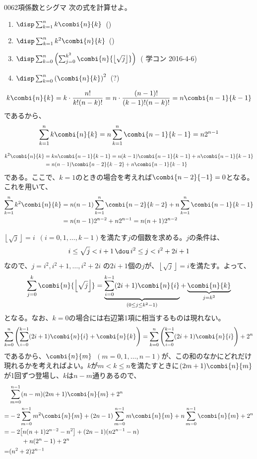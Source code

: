 \begin{prob}{006}{}{2項係数とシグマ}
 次の式を計算せよ。
 \begin{enumerate}
  \item $\disp \sum_{k=1}^n k \combi{n}{k}$~()
  \item $\disp \sum_{k=1}^n k^2 \combi{n}{k}$~()
  \item $\disp \sum_{k=0}^n \left(\sum_{j=0}^{k^2} \combi{n}{\left\lfloor \sqrt{j} \right\rfloor}\right)$~( 学コン 2016-4-6)
  \item $\disp \sum_{k=0}^n \left(\combi{n}{k}\right)^2$~(\hosi ?)
 \end{enumerate}
\end{prob}
\[ k\combi{n}{k}=k\cdot\frac{n!}{k! (n-k)!}=n\cdot\frac{(n-1)!}{(k-1)!(n-k)!}=n\combi{n-1}{k-1} \]
であるから、
\[ \sum_{k=1}^n k\combi{n}{k}=n\sum_{k=1}^n \combi{n-1}{k-1}=n2^{n-1} \]

\begin{align*}
 k^2\combi{n}{k}&=kn\combi{n-1}{k-1}=n(k-1)\combi{n-1}{k-1}+n\combi{n-1}{k-1} \\
 &=n(n-1)\combi{n-2}{k-2}+n\combi{n-1}{k-1}
\end{align*}
である。ここで、$k=1$のときの場合を考えれば$\combi{n-2}{-1}=0$となる。これを用いて、
\begin{align*}
 \sum_{k=1}^n k^2\combi{n}{k}&=n(n-1)\sum_{k=1}^n\combi{n-2}{k-2}+n\sum_{k=1}^n\combi{n-1}{k-1} \\
 &=n(n-1)2^{n-2}+n2^{n-1}=n(n+1)2^{n-2}
\end{align*}

$\left\lfloor\sqrt{j}\right\rfloor=i$~$(i=0,1,\dots,k-1)$を満たす$j$の個数を求める。$j$の条件は、
\[ i\le \sqrt{j}< i+1 \,\dou\, i^2\le j<i^2+2i+1 \]
なので、$j=i^2, i^2+1,\dots , i^2+2i$ の$2i+1$個の$j$が、$\left\lfloor\sqrt{j}\right\rfloor=i$を満たす。よって、
\[ \sum_{j=0}^k\combi{n}{\left\lfloor\sqrt{j}\right\rfloor} = \underbrace{\sum_{i=0}^{k-1}(2i+1)\combi{n}{i}}_{(0\le j\le k^2-1)} + \underbrace{\combi{n}{k}}_{j=k^2} \]
となる。なお、$k=0$の場合には右辺第1項に相当するものは現れない。
\[ \sum_{k=0}^n\left(\sum_{i=0}^{k-1}(2i+1)\combi{n}{i} +\combi{n}{k}\right) = \sum_{k=0}^{n}\left(\sum_{i=0}^{k-1}(2i+1)\combi{n}{i}\right) + 2^n \]
であるから、$\combi{n}{m}$~$(m=0,1,\dots,n-1)$が、この和のなかにどれだけ現れるかを考えればよい。$k$が$m<k\le n$を満たすときに$(2m+1)\combi{n}{m}$が1回ずつ登場し、$k$は$n-m$通りあるので、
\begin{align*}
 &\sum_{m=0}^{n-1}(n-m)(2m+1)\combi{n}{m} +2^n \\
 =& -2\sum_{m=0}^{n-1}m^2\combi{n}{m}+(2n-1)\sum_{m=0}^{n-1}m\combi{n}{m}+n\sum_{m=0}^{n-1}\combi{n}{m} + 2^n \\
 =& -2\bigl[n(n+1)2^{n-2}-n^2\bigr]+(2n-1)(n2^{n-1}-n) \\
 & \qquad +n(2^n-1)+2^n \\
 =& (n^2+2)2^{n-1}
\end{align*}

